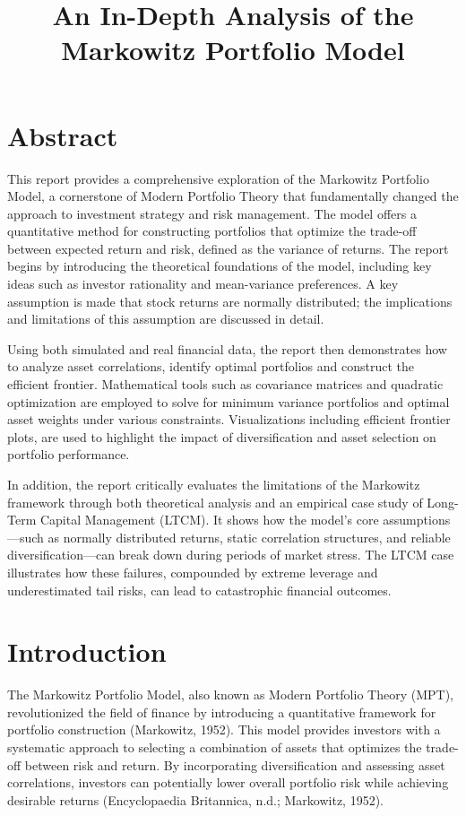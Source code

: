 \documentclass[11pt]{article}
\begin{document}
\title{An In-Depth Analysis of the Markowitz Portfolio Model}
\author{}
\date{}
\maketitle

\section{Abstract}
This report provides a comprehensive exploration of the Markowitz Portfolio Model, a cornerstone of Modern Portfolio Theory that fundamentally changed the approach to investment strategy and risk management. The model offers a quantitative method for constructing portfolios that optimize the trade-off between expected return and risk, defined as the variance of returns. The report begins by introducing the theoretical foundations of the model, including key ideas such as investor rationality and mean-variance preferences. A key assumption is made that stock returns are normally distributed; the implications and limitations of this assumption are discussed in detail.

Using both simulated and real financial data, the report then demonstrates how to analyze asset correlations, identify optimal portfolios and construct the efficient frontier. Mathematical tools such as covariance matrices and quadratic optimization are employed to solve for minimum variance portfolios and optimal asset weights under various constraints. Visualizations including efficient frontier plots, are used to highlight the impact of diversification and asset selection on portfolio performance.

In addition, the report critically evaluates the limitations of the Markowitz framework through both theoretical analysis and an empirical case study of Long-Term Capital Management (LTCM). It shows how the model’s core assumptions—such as normally distributed returns, static correlation structures, and reliable diversification—can break down during periods of market stress. The LTCM case illustrates how these failures, compounded by extreme leverage and underestimated tail risks, can lead to catastrophic financial outcomes.


\section{Introduction}
The Markowitz Portfolio Model, also known as Modern Portfolio Theory (MPT), revolutionized the field of finance by introducing a quantitative framework for portfolio construction (Markowitz, 1952). This model provides investors with a systematic approach to selecting a combination of assets that optimizes the trade-off between risk and return. By incorporating diversification and assessing asset correlations, investors can potentially lower overall portfolio risk while achieving desirable returns (Encyclopaedia Britannica, n.d.; Markowitz, 1952). 
\end{document}
